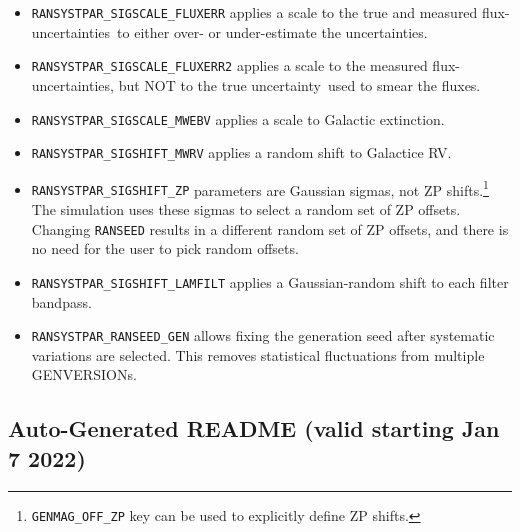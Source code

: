 \documentclass[12pt]{article}
\newcommand{\unc}{uncertainty}
\newcommand{\uncs}{uncertainties}
\begin{document}
\begin{itemize}
  \item {\tt RANSYSTPAR\_SIGSCALE\_FLUXERR} applies a scale to the 
        true and measured
        flux-\uncs\ to either over- or under-estimate the \uncs.
%
  \item {\tt RANSYSTPAR\_SIGSCALE\_FLUXERR2} applies a scale to the measured
        flux-\uncs, but NOT to the true \unc\ used to smear the fluxes. 
%
 \item {\tt RANSYSTPAR\_SIGSCALE\_MWEBV} applies a scale to Galactic extinction.
%
 \item {\tt RANSYSTPAR\_SIGSHIFT\_MWRV} applies a random shift to Galactice RV.
  \item {\tt RANSYSTPAR\_SIGSHIFT\_ZP} parameters are Gaussian sigmas,
        not ZP shifts.\footnote{{\tt GENMAG\_OFF\_ZP} key can be used 
            to explicitly define ZP shifts.}
        The simulation uses these sigmas to select a random set of ZP offsets.
        Changing {\tt RANSEED} results in a different random set of ZP offsets,
        and there is no need for the user to pick random offsets.
%
  \item {\tt RANSYSTPAR\_SIGSHIFT\_LAMFILT} applies a Gaussian-random shift
          to each filter bandpass.
%
  \item {\tt RANSYSTPAR\_RANSEED\_GEN} allows fixing the generation seed
        after systematic variations are selected. This removes statistical
        fluctuations from multiple GENVERSIONs.
\end{itemize}


   \subsection{Auto-Generated README (valid starting Jan 7 2022) }
   \label{ssec:SIM_README}
\end{document}
